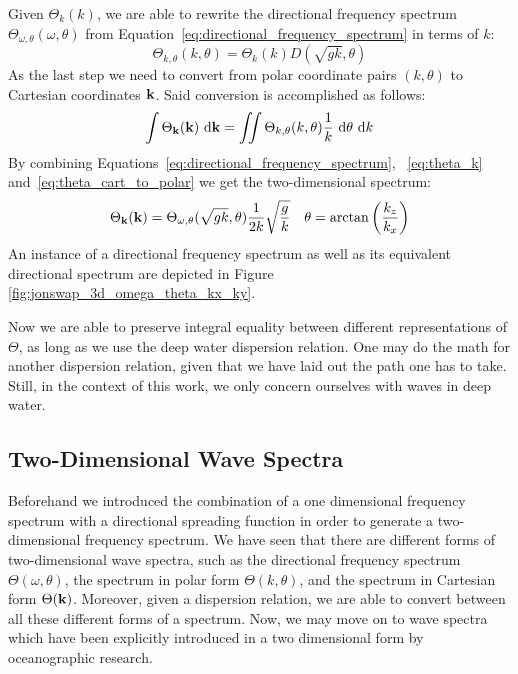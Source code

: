 Given $\Theta_k(k)$, we are able to rewrite the directional frequency spectrum
$\Theta_{\omega, \theta}(\omega, \theta)$ from
Equation~\ref{eq:directional_frequency_spectrum} in terms of \wavenumber $k$:
%
\begin{equation}
\label{eq:theta_k_polar}
 \Theta_{k,\theta}(k,\theta) = \Theta_k(k)D(\sqrt{gk},\theta)
\end{equation}
%
As the last step we need to convert from polar coordinate pairs 
$(k,\theta)$ to Cartesian \wavenumber coordinates $\mathbf{k}$. Said conversion 
is accomplished as follows:
%
\begin{equation}
\label{eq:theta_cart_to_polar}
\int\Theta_{\mathbf{k}}(\mathbf{k})~\mathrm{d}\mathbf{k} = 
\iint\Theta_{k,\theta}(k,\theta)\frac{1}{k}~\mathrm{d}\theta~\mathrm{d}k
\end{equation}
%
By combining Equations~\ref{eq:directional_frequency_spectrum}, 
~\ref{eq:theta_k} and~\ref{eq:theta_cart_to_polar} we get the two-dimensional
\wavenumber spectrum:
%
\begin{align}
\Theta_{\mathbf{k}}(\mathbf{k}) = \Theta_{\omega,\theta}(\sqrt{gk}, 
\theta)\frac{1}{2k}\sqrt{\frac{g}{k}} &&
\theta = \arctan\left(\frac{k_z}{k_x}\right)
\end{align}
%
An instance of a directional frequency spectrum as well as its equivalent
directional \wavenumber spectrum are depicted in Figure
\ref{fig:jonswap_3d_omega_theta_kx_ky}.

Now we are able to preserve integral equality between different representations 
of $\Theta$, as long as we use the deep water dispersion relation. One may do 
the math for another dispersion relation, given that we have laid out the path
one has to take. Still, in the context of this work, we only concern ourselves
with waves in deep water.
%
\subsection{Two-Dimensional Wave Spectra}
%
Beforehand we introduced the combination of a one dimensional 
frequency spectrum with a directional spreading function in order to generate a 
two-dimensional frequency spectrum. We have seen that there are different forms
of two-dimensional wave spectra, such as the directional frequency spectrum
$\Theta(\omega, \theta)$, the \wavenumber spectrum in polar form
$\Theta(k, \theta)$, and the \wavenumber spectrum in Cartesian form
$\Theta(\mathbf{k})$. Moreover, given a dispersion relation, we 
are able to convert between all these different forms of a spectrum. Now, we 
may move on to wave spectra which have been explicitly introduced in a two 
dimensional form by oceanographic research.

